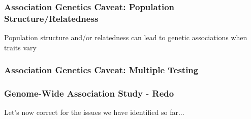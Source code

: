\documentclass[xcolor=dvipsnames]{beamer}
\begin{document}
\begin{frame}
	
	\frametitle{Association Genetics Caveat: Population Structure/Relatedness}

Population structure and/or relatedness can lead to genetic associations when traits vary
\end{frame}


\begin{frame}	
	\frametitle{Association Genetics Caveat: Multiple Testing}
\end{frame}

\begin{frame}
		\frametitle{Genome-Wide Association Study - Redo}

Let's now correct for the issues we have identified so far...

\end{frame}
\end{document}
